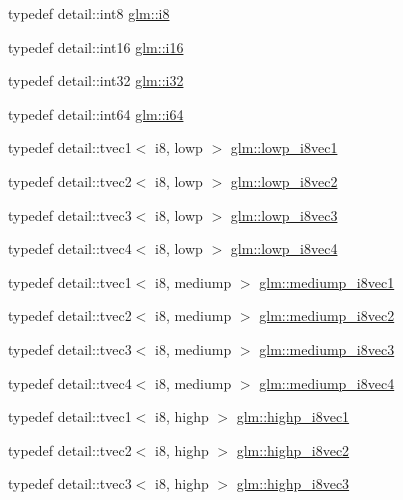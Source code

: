 \begin{CompactItemize}
typedef detail::int8 \hyperlink{group__gtc__type__precision_gae064be68b7d36cd7910c16e8ad18bba}{glm::i8}
\item 
typedef detail::int16 \hyperlink{group__gtc__type__precision_g35e5542ca05b29cc256fdafb8503d1fd}{glm::i16}
\item 
typedef detail::int32 \hyperlink{group__gtc__type__precision_g1d8ed5c43e91ea7d4528389da4fa9524}{glm::i32}
\item 
typedef detail::int64 \hyperlink{group__gtc__type__precision_gc7a7eaad46064fc952b06df33689da23}{glm::i64}
\item 
typedef detail::tvec1$<$ i8, lowp $>$ \hyperlink{group__gtc__type__precision_g490ff77964d0386c1db936eb2a324988}{glm::lowp\_\-i8vec1}
\item 
typedef detail::tvec2$<$ i8, lowp $>$ \hyperlink{group__gtc__type__precision_g511280c8869c7c79bba3c359f37f5559}{glm::lowp\_\-i8vec2}
\item 
typedef detail::tvec3$<$ i8, lowp $>$ \hyperlink{group__gtc__type__precision_g048811f03c327d4b56564a72d98800e8}{glm::lowp\_\-i8vec3}
\item 
typedef detail::tvec4$<$ i8, lowp $>$ \hyperlink{group__gtc__type__precision_g095202095a1fefbdae4a974c3b750223}{glm::lowp\_\-i8vec4}
\item 
typedef detail::tvec1$<$ i8, mediump $>$ \hyperlink{group__gtc__type__precision_g820f8b497e06d518968d00761747c547}{glm::mediump\_\-i8vec1}
\item 
typedef detail::tvec2$<$ i8, mediump $>$ \hyperlink{group__gtc__type__precision_g38eba1ab306fe5cc5eeafa35ce5b5b26}{glm::mediump\_\-i8vec2}
\item 
typedef detail::tvec3$<$ i8, mediump $>$ \hyperlink{group__gtc__type__precision_g91b40a693c1db26a7cc544339b326df3}{glm::mediump\_\-i8vec3}
\item 
typedef detail::tvec4$<$ i8, mediump $>$ \hyperlink{group__gtc__type__precision_gd41bf4bfa504dc1191623ff77151d01f}{glm::mediump\_\-i8vec4}
\item 
typedef detail::tvec1$<$ i8, highp $>$ \hyperlink{group__gtc__type__precision_g0334353753f93388bcc89f91c9aff476}{glm::highp\_\-i8vec1}
\item 
typedef detail::tvec2$<$ i8, highp $>$ \hyperlink{group__gtc__type__precision_g2224945795a870e41d951f0847d54f02}{glm::highp\_\-i8vec2}
\item 
typedef detail::tvec3$<$ i8, highp $>$ \hyperlink{group__gtc__type__precision_gd716792169ce7de963df25b865714438}{glm::highp\_\-i8vec3}
\item 

\end{CompactItemize}
